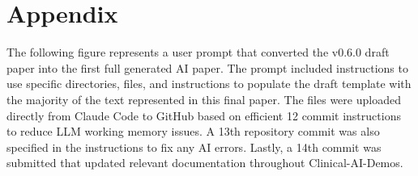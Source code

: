 {}
\section*{Appendix}

The following figure represents a user prompt that converted the v0.6.0 draft paper into the first full generated AI paper. The prompt included instructions to use specific directories, files, and instructions to populate the draft template with the majority of the text represented in this final paper. The files were uploaded directly from Claude Code to GitHub based on efficient 12 commit instructions to reduce LLM working memory issues. A 13th repository commit was also specified in the instructions to fix any AI errors. Lastly, a 14th commit was submitted that updated relevant documentation throughout Clinical-AI-Demos.





